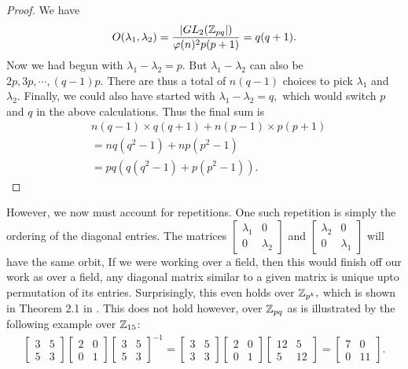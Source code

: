 \documentclass[11pt, titlepage, a4paper]{article}
\begin{document}
\begin{proof}
We have 
\begin{align*}
O(\lambda_{1},\lambda_{2}) =  \frac{|GL_{2}(\mathbb{Z}_{pq}|)}{\varphi(n)^{2}p(p+1)} = q(q+1).
\end{align*}
Now we had begun with $\lambda_{1}-\lambda_{2}=p.$ But $\lambda_{1}-\lambda_{2}$ can also be $2p, 3p, \cdots, (q-1)p.$ There are thus a total of $n(q-1)$ choices to pick $\lambda_{1}$ and $\lambda_{2}.$ Finally, we could also have started with $\lambda_{1}-\lambda_{2}=q,$ which would switch $p$ and $q$ in the above calculations. Thus the final sum is 
\begin{align*}
& n(q-1)\times q(q+1) + n(p-1)\times p(p+1) \\ & = nq(q^{2}-1)+ np(p^{2}-1) \\ &= pq(q(q^{2}-1) + p(p^{2}-1)).
\end{align*}

\end{proof}

However, we now must account for repetitions. One such repetition is simply the ordering of the diagonal entries. The matrices $\begin{bmatrix}
 \lambda_{1} & 0 \\
 0 & \lambda_{2}
\end{bmatrix}$ and $\begin{bmatrix}
 \lambda_{2} & 0 \\
 0 & \lambda_{1}
\end{bmatrix}$ will have the same orbit, If we were working over a field, then this would finish off our work as over a field, any diagonal matrix similar to a given matrix is unique upto permutation of its entries. Surprisingly, this even holds over $\mathbb{Z}_{p^{k}},$ which is shown in Theorem 2.1 in \cite{zpk}. This does not hold however, over $\mathbb{Z}_{pq}$ as is illustrated by the following example over $\mathbb{Z}_{15}$:
\begin{align*}
 \begin{bmatrix}
 3 & 5 \\
 5 & 3
\end{bmatrix} \begin{bmatrix}
 2 & 0 \\
 0 & 1
\end{bmatrix} \begin{bmatrix}
 3 & 5 \\
 5 & 3
\end{bmatrix}^{-1} =  \begin{bmatrix}
 3 & 5 \\
 3 & 3
\end{bmatrix} \begin{bmatrix}
 2 & 0 \\
 0 & 1
\end{bmatrix} \begin{bmatrix}
 12 & 5 \\
 5 & 12
\end{bmatrix} =\begin{bmatrix}
 7 & 0 \\
 0 & 11
\end{bmatrix}.
\end{align*}
\end{document}
